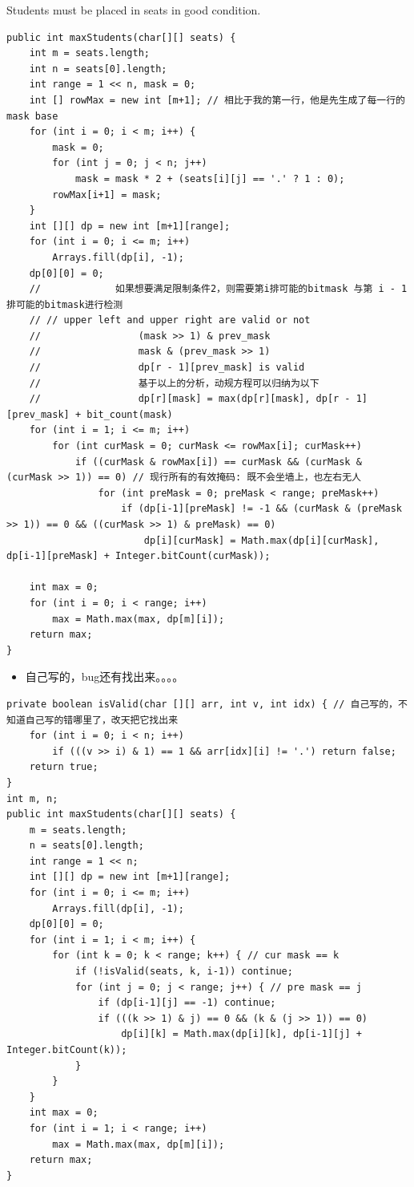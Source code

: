 \documentclass[9pt, b5paaper]{book}
\begin{document}
Students must be placed in seats in good condition.
\begin{verbatim}
public int maxStudents(char[][] seats) {
    int m = seats.length;
    int n = seats[0].length;
    int range = 1 << n, mask = 0;
    int [] rowMax = new int [m+1]; // 相比于我的第一行，他是先生成了每一行的mask base
    for (int i = 0; i < m; i++) { 
        mask = 0;
        for (int j = 0; j < n; j++) 
            mask = mask * 2 + (seats[i][j] == '.' ? 1 : 0);
        rowMax[i+1] = mask;
    }
    int [][] dp = new int [m+1][range];
    for (int i = 0; i <= m; i++) 
        Arrays.fill(dp[i], -1);
    dp[0][0] = 0;
    //             如果想要满足限制条件2，则需要第i排可能的bitmask 与第 i - 1排可能的bitmask进行检测
    // // upper left and upper right are valid or not
    //                 (mask >> 1) & prev_mask 
    //                 mask & (prev_mask >> 1)
    //                 dp[r - 1][prev_mask] is valid
    //                 基于以上的分析，动规方程可以归纳为以下
    //                 dp[r][mask] = max(dp[r][mask], dp[r - 1][prev_mask] + bit_count(mask)
    for (int i = 1; i <= m; i++) 
        for (int curMask = 0; curMask <= rowMax[i]; curMask++) 
            if ((curMask & rowMax[i]) == curMask && (curMask & (curMask >> 1)) == 0) // 现行所有的有效掩码: 既不会坐墙上，也左右无人
                for (int preMask = 0; preMask < range; preMask++) 
                    if (dp[i-1][preMask] != -1 && (curMask & (preMask >> 1)) == 0 && ((curMask >> 1) & preMask) == 0)
                        dp[i][curMask] = Math.max(dp[i][curMask], dp[i-1][preMask] + Integer.bitCount(curMask));

    int max = 0;
    for (int i = 0; i < range; i++) 
        max = Math.max(max, dp[m][i]);
    return max;
}
\end{verbatim}
\begin{itemize}
\item 自己写的，bug还有找出来。。。。
\end{itemize}
\begin{verbatim}
private boolean isValid(char [][] arr, int v, int idx) { // 自己写的，不知道自己写的错哪里了，改天把它找出来
    for (int i = 0; i < n; i++) 
        if (((v >> i) & 1) == 1 && arr[idx][i] != '.') return false;
    return true;
}
int m, n;
public int maxStudents(char[][] seats) {
    m = seats.length;
    n = seats[0].length;
    int range = 1 << n;
    int [][] dp = new int [m+1][range];
    for (int i = 0; i <= m; i++) 
        Arrays.fill(dp[i], -1);
    dp[0][0] = 0;
    for (int i = 1; i < m; i++) {
        for (int k = 0; k < range; k++) { // cur mask == k
            if (!isValid(seats, k, i-1)) continue;
            for (int j = 0; j < range; j++) { // pre mask == j
                if (dp[i-1][j] == -1) continue;
                if (((k >> 1) & j) == 0 && (k & (j >> 1)) == 0)
                    dp[i][k] = Math.max(dp[i][k], dp[i-1][j] + Integer.bitCount(k));
            }
        }
    }
    int max = 0;
    for (int i = 1; i < range; i++) 
        max = Math.max(max, dp[m][i]);
    return max;
}
\end{verbatim}
\end{document}
